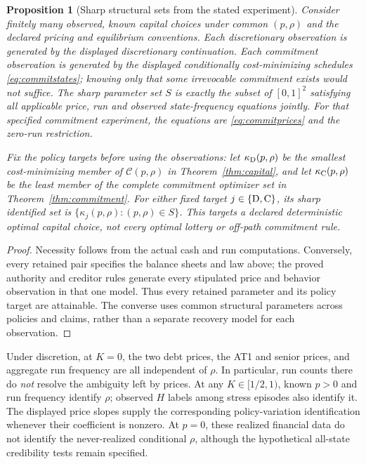 \documentclass[11pt,a4paper]{article}
\numberwithin{equation}{section}
\newtheorem{proposition}[theorem]{Proposition}
\theoremstyle{definition}
\begin{document}
\begin{proposition}[Sharp structural sets from the stated experiment]\label{prop:sharp}
Consider finitely many observed, known capital choices under common
\((p,\rho)\) and the declared pricing and equilibrium conventions.
Each discretionary observation is generated by the displayed discretionary
continuation. Each commitment observation is generated by the displayed
conditionally cost-minimizing schedules \eqref{eq:commitstates}; knowing
only that some irrevocable commitment exists would not suffice.
The sharp parameter set \(S\) is exactly the subset of \([0,1]^2\)
satisfying all applicable price, run and observed state-frequency equations
jointly. For that specified commitment experiment, the equations are
\eqref{eq:commitprices} and the zero-run restriction.

Fix the policy targets before using the observations: let
\(\kappa_{\rm D}(p,\rho)\) be the smallest cost-minimizing member of
\(\mathcal C(p,\rho)\) in Theorem~\ref{thm:capital}, and let
\(\kappa_{\rm C}(p,\rho)\) be the least member of the complete
commitment optimizer set in Theorem~\ref{thm:commitment}.
For either fixed target \(j\in\{\rm D,C\}\), its sharp identified
set is \(\{\kappa_j(p,\rho):(p,\rho)\in S\}\).
This targets a declared deterministic optimal capital choice, not every
optimal lottery or off-path commitment rule.
\end{proposition}
\begin{proof}
Necessity follows from the actual cash and run computations. Conversely,
every retained pair specifies the balance sheets and law above; the
proved authority and creditor rules generate every stipulated price
and behavior observation in that one model. Thus every retained
parameter and its policy target are attainable. The converse uses
common structural parameters across policies and claims, rather than
a separate recovery model for each observation.
\end{proof}

Under discretion, at \(K=0\), the two debt prices, the AT1 and senior prices, and
aggregate run frequency are all independent of \(\rho\). In particular,
run counts there do \emph{not} resolve the ambiguity left by prices.
At any \(K\in[1/2,1)\), known \(p>0\) and run frequency identify
\(\rho\); observed \(H\) labels among stress episodes also identify it.
The displayed price slopes supply the corresponding policy-variation
identification whenever their coefficient is nonzero. At \(p=0\),
these realized financial data do not identify the never-realized
conditional \(\rho\), although the hypothetical all-state credibility
tests remain specified.
\end{document}
